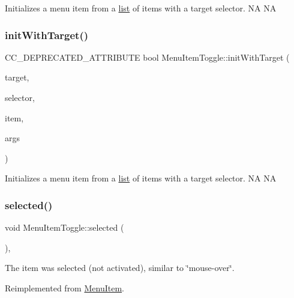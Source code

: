 Initializes a menu item from a \hyperlink{protocollist-p}{list} of items with a target selector.  NA  NA \mbox{\label{classMenuItemToggle_ae368bede42fc7e7fa59e607dcb73d8f8}} 
\subsubsection{\texorpdfstring{init\+With\+Target()}{initWithTarget()}\hspace{0.1cm}{\footnotesize\ttfamily [2/2]}}
{\footnotesize\ttfamily C\+C\+\_\+\+D\+E\+P\+R\+E\+C\+A\+T\+E\+D\+\_\+\+A\+T\+T\+R\+I\+B\+U\+TE bool Menu\+Item\+Toggle\+::init\+With\+Target (\begin{DoxyParamCaption}\item[{\hyperlink{classRef}{Ref} $\ast$}]{target,  }\item[{S\+E\+L\+\_\+\+Menu\+Handler}]{selector,  }\item[{\hyperlink{classMenuItem}{Menu\+Item} $\ast$}]{item,  }\item[{va\+\_\+list}]{args }\end{DoxyParamCaption})}

Initializes a menu item from a \hyperlink{protocollist-p}{list} of items with a target selector.  NA  NA \mbox{\label{classMenuItemToggle_ab9a7783e4ba3ed0d8636ea77424f7aab}} 
\subsubsection{\texorpdfstring{selected()}{selected()}\hspace{0.1cm}{\footnotesize\ttfamily [1/2]}}
{\footnotesize\ttfamily void Menu\+Item\+Toggle\+::selected (\begin{DoxyParamCaption}{ }\end{DoxyParamCaption})\hspace{0.3cm}{\ttfamily [override]}, {\ttfamily [virtual]}}

The item was selected (not activated), similar to \char`\"{}mouse-\/over\char`\"{}. 

Reimplemented from \hyperlink{classMenuItem_aa0330b2c1e2066eb7eee87ade6e6740f}{Menu\+Item}.

